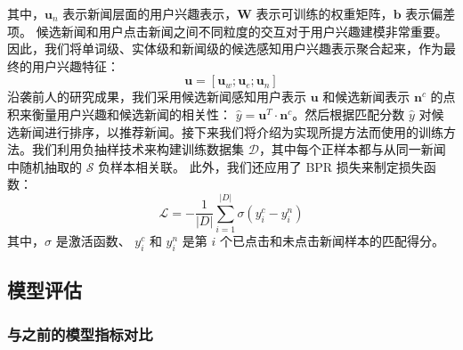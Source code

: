 \documentclass[withoutpreface,bwprint]{cumcmthesis} %
\begin{document}
	其中，$\mathbf{u}_n$ 表示新闻层面的用户兴趣表示，$\mathbf{W}$ 表示可训练的权重矩阵，$\mathbf{b}$ 表示偏差项。
	候选新闻和用户点击新闻之间不同粒度的交互对于用户兴趣建模非常重要。因此，我们将单词级、实体级和新闻级的候选感知用户兴趣表示聚合起来，作为最终的用户兴趣特征：
	\begin{equation}
	\mathbf{u} = [\mathbf{u}_w; \mathbf{u}_e; \mathbf{u}_n]
	\end{equation}
	沿袭前人的研究成果，我们采用候选新闻感知用户表示 $\mathbf{u}$ 和候选新闻表示 $\mathbf{n}^c$ 的点积来衡量用户兴趣和候选新闻的相关性： $\hat{y} = \mathbf{u}^T \cdot \mathbf{n}^c$。然后根据匹配分数 $\hat{y}$ 对候选新闻进行排序，以推荐新闻。接下来我们将介绍为实现所提方法而使用的训练方法。我们利用负抽样技术来构建训练数据集 $\mathcal{D}$，其中每个正样本都与从同一新闻中随机抽取的 $\mathcal{S}$ 负样本相关联。
	此外，我们还应用了 BPR 损失来制定损失函数：
	\begin{equation}\label{eatt}
	\mathcal{L} =- \frac{1}{|D|}  {\textstyle \sum_{i=1}^{|D|}{\sigma (y_i^c-y_i^n)}}
	\end{equation}
	其中，$\sigma$ 是激活函数、
	$y_i^c$ 和 $y_i^n$ 是第 $i$ 个已点击和未点击新闻样本的匹配得分。
	\newpage
	\subsection{模型评估}
	\subsubsection{与之前的模型指标对比}
	\begin{table}[h]
		\centering
		\caption{MGCA与之前模型的对比}
	\end{table}
\end{document}
